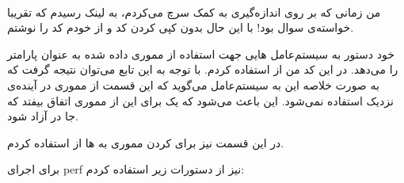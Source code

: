 \\\noindent
من زمانی که بر روی اندازه‌گیری
به کمک
سرچ می‌کردم، به
لینک رسیدم که تقریبا خواسته‌ی سوال بود! با این حال بدون کپی کردن کد و از خودم کد را نوشتم.

خود دستور
به سیستم‌عامل
هایی
جهت استفاده از مموری داده شده به عنوان پارامتر را می‌دهد. در این کد من از
استفاده کردم. با توجه به
این تابع می‌توان نتیجه گرفت که به صورت خلاصه این
به سیستم‌عامل می‌گوید که این قسمت از مموری در آینده‌ی نزدیک استفاده نمی‌شود.
این باعث می‌شود که یک
برای این
از مموری اتفاق بیفتد که جا در
آزاد شود.

در این قسمت نیز برای
کردن مموری به
ها
از
استفاده کردم.

برای اجرای
perf
نیز از دستورات زیر استفاده کردم:

